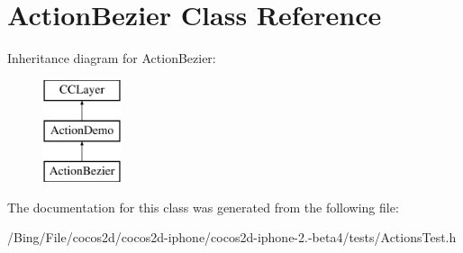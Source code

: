 \hypertarget{interface_action_bezier}{\section{Action\-Bezier Class Reference}
\label{interface_action_bezier}
}
Inheritance diagram for Action\-Bezier\-:\begin{figure}[H]
\begin{center}
\leavevmode
\includegraphics[height=3.000000cm]{interface_action_bezier}
\end{center}
\end{figure}


The documentation for this class was generated from the following file\-:\begin{DoxyCompactItemize}
\item 
/\-Bing/\-File/cocos2d/cocos2d-\/iphone/cocos2d-\/iphone-\/2.-\/beta4/tests/Actions\-Test.\-h\end{DoxyCompactItemize}
